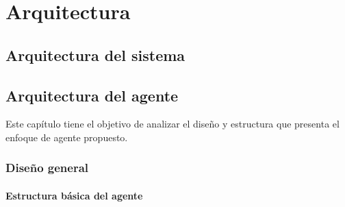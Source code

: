 
\chapter{Arquitectura}
\label{chap:Arquitectura}

\section{Arquitectura del sistema}
\label{sec:arquitectura_sistema}

\section{Arquitectura del agente}
\label{sec:arquitectura_agente}

 Este capítulo tiene el objetivo de analizar el diseño y estructura que
 presenta el enfoque de agente propuesto.


\subsection{Diseño general}
\label{sub:diseno_general}
  
  
\subsubsection{Estructura básica del agente}
\label{subsub:estructura_basica_de_agente}
  
